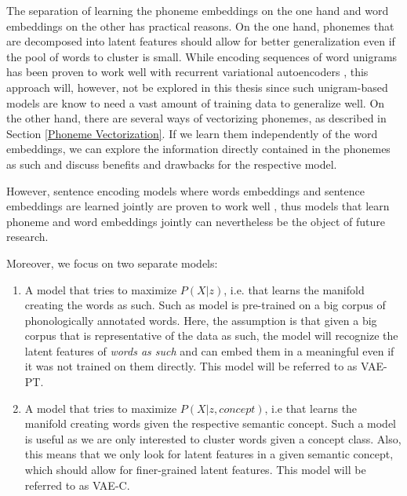 \documentclass[6pt]{article}
\begin{document}
The separation of learning the phoneme embeddings on the one hand and word embeddings on the other has practical reasons. On the one hand, phonemes that are decomposed into latent features should allow for better generalization even if the pool of words to cluster is small. While encoding sequences of word unigrams has been proven to work well with recurrent variational autoencoders \citep{bowman2015generating}, this approach will, however, not be explored in this thesis since such unigram-based models are know to need a vast amount of training data to generalize well. On the other hand, there are several ways of vectorizing phonemes, as described in Section \ref{Phoneme Vectorization}. If we learn them independently of the word embeddings, we can explore the information directly contained in the phonemes as such and discuss benefits and drawbacks for the respective model.

However, sentence encoding models where words embeddings and sentence embeddings are learned jointly are proven to work well \cite{kiros2015skip}, thus models that learn phoneme and word embeddings jointly can nevertheless be the object of future research.


Moreover, we focus on two separate models:
\begin{enumerate}
\item A model that tries to maximize $P(X|z)$, i.e. that learns the manifold creating the words as such. Such as model is pre-trained on a big corpus of phonologically annotated words. Here, the assumption is that given a big corpus that is representative of the data as such, the model will recognize the latent features of \textit{words as such} and can embed them in a meaningful even if it was not trained on them directly. This model will be referred to as VAE-PT.
\item A model that tries to maximize $P(X|z,concept)$, i.e that learns the manifold creating words given the respective semantic concept. Such a model is useful as we are only interested to cluster words given a concept class. Also, this means that we only look for latent features in a given semantic concept, which should allow for finer-grained latent features. This model will be referred to as VAE-C.
\end{enumerate}
\end{document}
